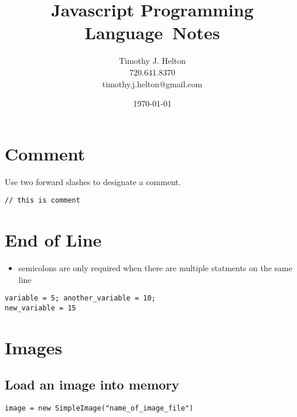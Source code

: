 \documentclass{article}
\newcommand{\topic}{Javascript Programming Language}
\begin{document}
\title{\topic \ Notes}
\author{Timothy J. Helton\\720.641.8370\\timothy.j.helton@gmail.com}
\date{\today}

\begin{titlingpage}
  \maketitle
\end{titlingpage}

\hypertarget{toc}{}
\tableofcontents
\newpage

\listoffigures
\listoftables
\newpage

\printnomenclature[0.75in]
\hfill

\newpage

\pagestyle{fancy}
\section{Comment}
Use two forward slashes to designate a comment.

\begin{lstlisting}
// this is comment
\end{lstlisting}

\section{End of Line}
\begin{itemize}
  \item semicolons are only required when there are multiple statments on the
    same line
\end{itemize}

\begin{lstlisting}
variable = 5; another_variable = 10;
new_variable = 15
\end{lstlisting}

\section{Images}

\subsection{Load an image into memory}
\begin{lstlisting}
image = new SimpleImage("name_of_image_file")
\end{lstlisting}
\end{document}
